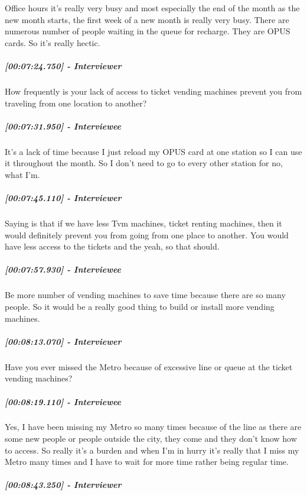 \documentclass[a4paper,12pt]{article}
\begin{document}
Office hours it's really very busy and most especially the end of the
month as the new month starts, the first week of a new month is really
very busy. There are numerous number of people waiting in the queue for
recharge. They are OPUS cards. So it's really hectic.

\hypertarget{interviewer-35}{%
\subparagraph{{[}00:07:24.750{]} - Interviewer}\label{interviewer-35}}

How frequently is your lack of access to ticket vending machines prevent
you from traveling from one location to another?

\hypertarget{interviewee-27}{%
\subparagraph{{[}00:07:31.950{]} - Interviewee}\label{interviewee-27}}

It's a lack of time because I just reload my OPUS card at one station so
I can use it throughout the month. So I don't need to go to every other
station for no, what I'm.

\hypertarget{interviewer-36}{%
\subparagraph{{[}00:07:45.110{]} - Interviewer}\label{interviewer-36}}

Saying is that if we have less Tvm machines, ticket renting machines,
then it would definitely prevent you from going from one place to
another. You would have less access to the tickets and the yeah, so that
should.

\hypertarget{interviewee-28}{%
\subparagraph{{[}00:07:57.930{]} - Interviewee}\label{interviewee-28}}

Be more number of vending machines to save time because there are so
many people. So it would be a really good thing to build or install more
vending machines.

\hypertarget{interviewer-37}{%
\subparagraph{{[}00:08:13.070{]} - Interviewer}\label{interviewer-37}}

Have you ever missed the Metro because of excessive line or queue at the
ticket vending machines?

\hypertarget{interviewee-29}{%
\subparagraph{{[}00:08:19.110{]} - Interviewee}\label{interviewee-29}}

Yes, I have been missing my Metro so many times because of the line as
there are some new people or people outside the city, they come and they
don't know how to access. So really it's a burden and when I'm in hurry
it's really that I miss my Metro many times and I have to wait for more
time rather being regular time.

\hypertarget{interviewer-38}{%
\subparagraph{{[}00:08:43.250{]} - Interviewer}\label{interviewer-38}}
\end{document}
